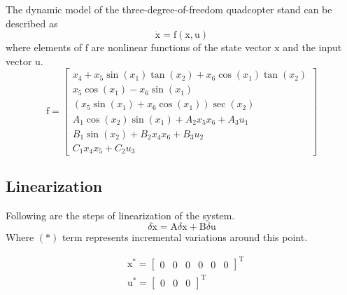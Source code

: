 \documentclass[conference]{IEEEtran}
\begin{document}
The dynamic model of the three-degree-of-freedom quadcopter stand can be described as
\begin{equation}
	\boldsymbol{\dot{\mathrm{x}}} = \boldsymbol{\mathrm{f}}(\boldsymbol{\mathrm{x}}, \boldsymbol{\mathrm{u}})
\end{equation}
where elements of $\boldsymbol{\mathrm{f}}$ are nonlinear functions of the state vector $\boldsymbol{\mathrm{x}}$
and the input vector $\boldsymbol{\mathrm{u}}$.
\begin{equation}
	\boldsymbol{\mathrm{f}} = \begin{bmatrix}
		x_4 + x_5\sin(x_1)\tan(x_2) + x_6\cos(x_1)\tan(x_2)\\
		x_5\cos(x_1)- x_6\sin(x_1)\\
		(x_5\sin(x_1) + x_6\cos(x_1))\sec(x_2)\\
		A_1\cos(x_2)\sin(x_1) + 
		A_2x_5x_6 + A_3u_1
		\\
		B_1\sin(x_2) + 
		B_2x_4x_6 + B_3u_2\\
		C_1x_4x_5 + 
		C_2u_3
	\end{bmatrix}
\end{equation} 
\subsection{Linearization}
Following are the steps of linearization of the system.
\begin{equation}
	\delta \dot{\boldsymbol{\mathrm{x}}} = \boldsymbol{\mathrm{A}}\delta \boldsymbol{\mathrm{x}} + \boldsymbol{\mathrm{B}}\delta \boldsymbol{\mathrm{u}}
\end{equation}
Where $(*)$ term represents incremental variations around this point. 

\begin{equation}
	\begin{split}
		&\boldsymbol{\mathrm{x}^*} = \begin{bmatrix}
			0& 0 & 0 & 0& 0& 0
		\end{bmatrix}^\mathrm{T}\\
		&\boldsymbol{\mathrm{u}^*} = \begin{bmatrix}
			0&0&0
		\end{bmatrix}^\mathrm{T}
	\end{split}
\end{equation}

\end{document}
